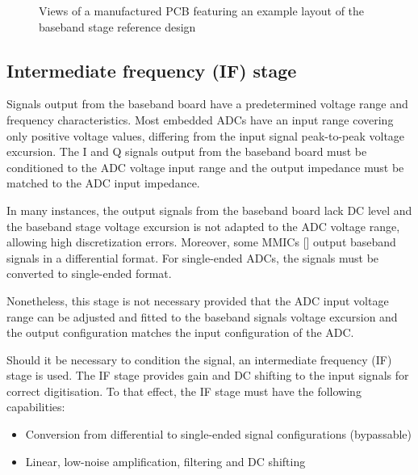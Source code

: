 \begin{figure}[ht]
	\centering
	\caption{Views of a manufactured PCB featuring an example layout of the baseband stage reference design \label{fig:bb_board}}
\end{figure}

\subsection{Intermediate frequency (IF) stage}

Signals output from the baseband board have a predetermined voltage range and frequency characteristics. Most embedded ADCs have an input range covering only positive voltage values, differing from the input signal peak-to-peak voltage excursion. The I and Q signals output from the baseband board must be conditioned to the ADC voltage input range and the output impedance must be matched to the ADC input impedance.

In many instances, the output signals from the baseband board lack DC level and the baseband stage voltage excursion is not adapted to the ADC voltage range, allowing high discretization errors. Moreover, some MMICs [\cite{Antolinos2020}] output baseband signals in a differential format. For single-ended ADCs, the signals must be converted to single-ended format.

Nonetheless, this stage is not necessary provided that the ADC input voltage range can be adjusted and fitted to the baseband signals voltage excursion and the output configuration matches the input configuration of the ADC.

Should it be necessary to condition the signal, an intermediate frequency (IF) stage is used. The IF stage provides gain and DC shifting to the input signals for correct digitisation. To that effect, the IF stage must have the following capabilities:
\begin{itemize}
	\item Conversion from differential to single-ended signal configurations (bypassable)
	\item Linear, low-noise amplification, filtering and DC shifting
\end{itemize}


